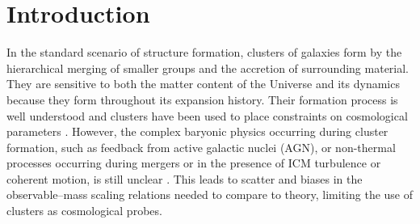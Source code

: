 \documentclass[twocolumn,traditabstract]{aa}
\begin{document}
\maketitle

\section{Introduction}\label{sec:Introduction}
In the standard scenario of structure formation, clusters of galaxies form by the hierarchical merging of smaller groups and the accretion of surrounding material. They are sensitive to both the matter content of the Universe and its dynamics because they form throughout its expansion history. Their formation process is  well understood and clusters have been used to place constraints on cosmological parameters \citep[e.g.][]{planck2013cluster_count}. However, the complex baryonic physics occurring during cluster formation, such as feedback from active galactic nuclei (AGN), or non-thermal processes occurring during mergers or in the presence of ICM turbulence or coherent motion, is still unclear \citep[see for example][]{borgani2011}. This leads to scatter and biases in the observable--mass scaling relations needed to compare to theory, limiting the use of clusters as cosmological probes.
\end{document}
